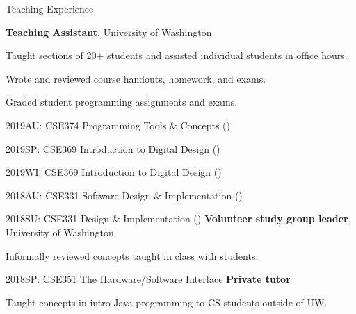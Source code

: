 \begin{rubric}{Teaching Experience}

\entry*[2018 -- 2019]%
	\textbf{Teaching Assistant}, University of Washington
	\par Taught sections of 20+ students and assisted individual students in office hours.
	\par Wrote and reviewed course handouts, homework, and exams.
	\par Graded student programming assignments and exams.
	\par 2019AU: CSE374 Programming Tools \& Concepts (\pPirtleT{})
	\par 2019SP: CSE369 Introduction to Digital Design (\pHsiaJ{})
	\par 2019WI: CSE369 Introduction to Digital Design (\pHsiaJ{})
	\par 2018AU: CSE331 Software Design \& Implementation (\pErnstM{})
	\par 2018SU: CSE331 Design \& Implementation (\pPerlmutterL{})
\entry*[2018]%
	\textbf{Volunteer study group leader}, University of Washington
	\par Informally reviewed concepts taught in class with students.
	\par 2018SP: CSE351 The Hardware/Software Interface
\entry*[2017]%
	\textbf{Private tutor}
	\par Taught concepts in intro Java programming to CS students outside of UW.
\end{rubric}